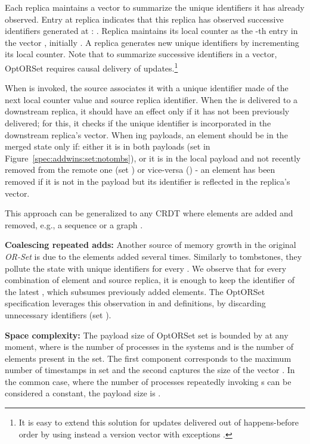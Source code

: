 \documentclass[a4paper]{article}
\begin{document}
Each replica  maintains a vector  \cite{Parker83Detection} to
summarize the unique identifiers it has already observed.  Entry 
at replica  indicates that this replica has observed  successive
identifiers generated at : .  Replica 
maintains its local counter as the -th entry in the vector ,
initially .  A replica generates new unique identifiers  by
incrementing its local counter.  Note that to summarize successive
identifiers in a  vector, OptORSet requires causal delivery of
updates.\footnote{ It is easy to extend this solution for updates delivered
out of happens-before order by using instead a version vector with
exceptions \cite{DBLP:journals/dc/MalkhiT07}.}

When \add is invoked, the source associates it with a unique identifier made
of the next local counter value and source replica identifier.  When the
\add is delivered to a downstream replica, it should have an effect only if
it has not been previously delivered; for this, it checks if the unique
identifier is incorporated in the downstream replica's vector.  When
\merge{}ing payloads, an element should be in the merged state only if:
either it is in both payloads (set  in
Figure~\ref{spec:addwins:set:notombs}), or it is in the local payload and
not recently removed from the remote one (set ) or vice-versa () -
an element has been removed if it is not in the payload but its identifier
is reflected in the replica's vector.

This approach can be generalized to any CRDT where elements are added
and removed, e.g., a sequence \cite{alg:rep:sh131,app:rep:1652} or a
graph \cite{syn:sh144}.



{\bf Coalescing repeated adds:} Another source of memory growth in the
original \emph{OR-Set} is due to the elements added several times.  Similarly to
tombstones, they pollute the state with unique identifiers for every \add{}.
We observe that for every combination of element and source replica, it is
enough to keep the identifier of the latest \add, which subsumes previously
added elements.  The OptORSet specification leverages this observation in
\add{} and \merge{} definitions, by discarding unnecessary identifiers (set
).

{\bf Space complexity:} The payload size of \mbox{OptORSet} set is bounded
by  at any moment, where  is the number of
processes in the systems and  is the number of elements present
in the set.  The first component corresponds to the maximum number of
timestamps in set  and the second captures the size of the vector .
In the common case, where the number of processes repeatedly invoking
\add{}s can be considered a constant, the payload size is .
\end{document}
